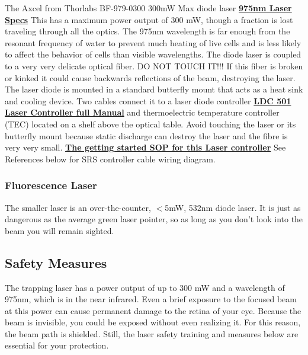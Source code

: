 \documentclass{../lab}
\begin{document}
The Axcel from Thorlabs BF-979-0300 300mW Max diode laser \href{http://experimentationlab.berkeley.edu/sites/default/files/images/975nm-Laser-Specs.pdf}{\textbf{975nm Laser Specs}} This has a maximum power output of 300 mW, though a fraction is lost traveling through all the optics. The 975nm wavelength is far enough from the resonant frequency of water to prevent much heating of live cells and is less likely to affect the behavior of cells than visible wavelengths. The diode laser is coupled to a very very delicate optical fiber. DO NOT TOUCH IT!!! If this fiber is broken or kinked it could cause backwards reflections of the beam, destroying the laser. The laser diode is mounted in a standard butterfly mount that acts as a heat sink and cooling device. Two cables connect it to a laser diode controller \href{http://experimentationlab.berkeley.edu/sites/default/files/images/LDC501m.pdf}{\textbf{LDC 501 Laser Controller full Manual}} and thermoelectric temperature controller (TEC) located on a shelf above the optical table. Avoid touching the laser or its butterfly mount because static discharge can destroy the laser and the fibre is very very small. \href{http://experimentationlab.berkeley.edu/sites/default/files/images/SOP\_Laser\_Diode\_Driver.pdf}{\textbf{The getting started SOP for this Laser controller}} See References below for SRS controller cable wiring diagram.

\subsubsection{Fluorescence Laser}

The smaller laser is an over-the-counter, $<$5mW, 532nm diode laser. It is just as dangerous as the average green laser pointer, so as long as you don't look into the beam you will remain sighted.

\subsection{Safety Measures}

The trapping laser has a power output of up to 300 mW and a wavelength of 975nm, which is in the near infrared. Even a brief exposure to the focused beam at this power can cause permanent damage to the retina of your eye. Because the beam is invisible, you could be exposed without even realizing it. For this reason, the beam path is shielded. Still, the laser safety training and measures below are essential for your protection.
\end{document}
